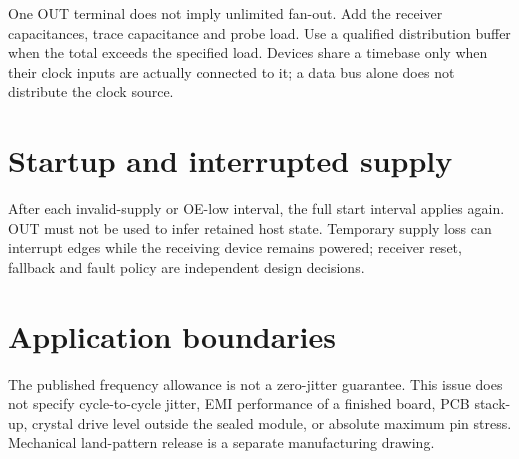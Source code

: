 \documentclass[10pt]{article}
\begin{document}
One OUT terminal does not imply unlimited fan-out. Add the receiver capacitances, trace capacitance and probe load. Use a qualified distribution buffer when the total exceeds the specified load. Devices share a timebase only when their clock inputs are actually connected to it; a data bus alone does not distribute the clock source.
\section*{Startup and interrupted supply}
After each invalid-supply or OE-low interval, the full start interval applies again. OUT must not be used to infer retained host state. Temporary supply loss can interrupt edges while the receiving device remains powered; receiver reset, fallback and fault policy are independent design decisions.
\section*{Application boundaries}
The published frequency allowance is not a zero-jitter guarantee. This issue does not specify cycle-to-cycle jitter, EMI performance of a finished board, PCB stack-up, crystal drive level outside the sealed module, or absolute maximum pin stress. Mechanical land-pattern release is a separate manufacturing drawing.
\vfill{}
\end{document}
